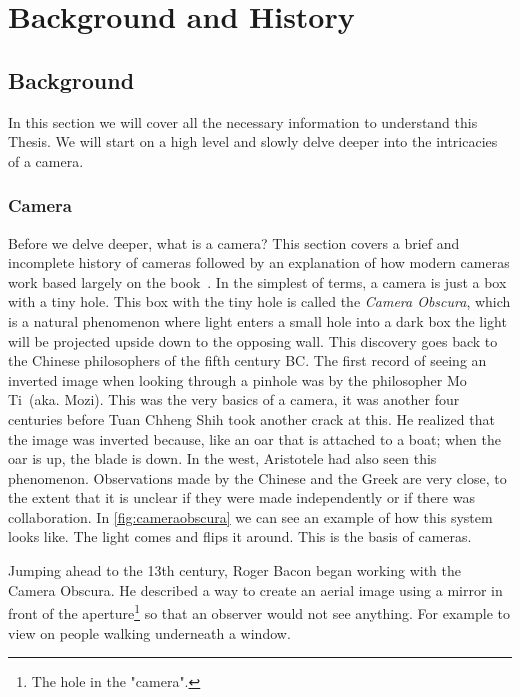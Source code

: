 \chapter{Background and History\label{section:history}}
\section{Background}\label{section:background}
In this section we will cover all the necessary information to understand this
Thesis. We will start on a high level and slowly delve deeper into the
intricacies of a camera.

\subsection{Camera}
Before we delve deeper, what is a camera? This section covers a brief
and incomplete history of cameras followed by an explanation of how modern
cameras work based largely on the book~\cite{hammond1981camera}. In the
simplest of terms, a camera is just a box with a tiny hole. This box with the
tiny hole is called the \textit{Camera Obscura}, which is a natural phenomenon
where light enters a small hole into a dark box the light will be projected
upside down to the opposing wall. This discovery goes back to the Chinese
philosophers of the fifth century BC. The first record of seeing an inverted
image when looking through a pinhole was by the philosopher Mo Ti~(aka. Mozi).
This was the very basics of a camera, it was another four centuries before Tuan
Chheng Shih took another crack at this. He realized that the image was inverted
because, like an oar that is attached to a boat; when the oar is up, the blade
is down. In the west, Aristotele had also seen this phenomenon. Observations
made by the Chinese and the Greek are very close, to the extent that it is
unclear if they were made independently or if there was collaboration. In
\cref{fig:cameraobscura} we can see an example of how this system looks like.
The light comes and flips it around. This is the basis of cameras.

Jumping ahead to the 13th century, Roger Bacon began working with the Camera
Obscura. He described a way to create an aerial image using a mirror in front of
the aperture\footnote{The hole in the "camera".} so that an observer would not
see anything. For example to view on people walking underneath a window.

